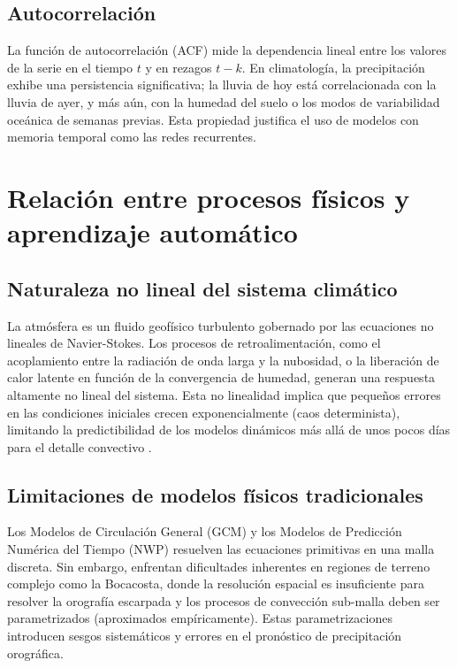 \subsection{Autocorrelación}
La función de autocorrelación (ACF) mide la dependencia lineal entre los valores de la serie en el tiempo \(t\) y en rezagos \(t-k\). En climatología, la precipitación exhibe una persistencia significativa; la lluvia de hoy está correlacionada con la lluvia de ayer, y más aún, con la humedad del suelo o los modos de variabilidad oceánica de semanas previas. Esta propiedad justifica el uso de modelos con memoria temporal como las redes recurrentes.

\section{Relación entre procesos físicos y aprendizaje automático}

\subsection{Naturaleza no lineal del sistema climático}
La atmósfera es un fluido geofísico turbulento gobernado por las ecuaciones no lineales de Navier-Stokes. Los procesos de retroalimentación, como el acoplamiento entre la radiación de onda larga y la nubosidad, o la liberación de calor latente en función de la convergencia de humedad, generan una respuesta altamente no lineal del sistema. Esta no linealidad implica que pequeños errores en las condiciones iniciales crecen exponencialmente (caos determinista), limitando la predictibilidad de los modelos dinámicos más allá de unos pocos días para el detalle convectivo \citep{cli14020038, lopez2006incertidumbre, dunkel2015_navier_stokes}.

\subsection{Limitaciones de modelos físicos tradicionales}
Los Modelos de Circulación General (GCM) y los Modelos de Predicción Numérica del Tiempo (NWP) resuelven las ecuaciones primitivas en una malla discreta. Sin embargo, enfrentan dificultades inherentes en regiones de terreno complejo como la Bocacosta, donde la resolución espacial es insuficiente para resolver la orografía escarpada y los procesos de convección sub-malla deben ser parametrizados (aproximados empíricamente). Estas parametrizaciones introducen sesgos sistemáticos y errores en el pronóstico de precipitación orográfica.

